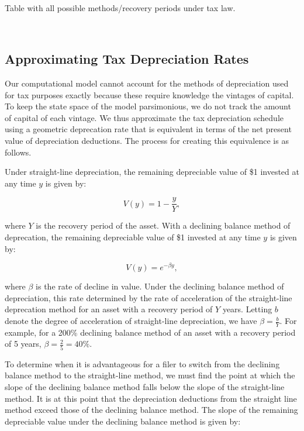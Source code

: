 \documentclass[article,11pt,letterpaper,fleqn]{article}
\theoremstyle{definition}
\numberwithin{equation}{section}
\begin{document}
\ \\
\begin{center}
Table with all possible methods/recovery periods under tax law.
\end{center}
\ \\


\subsection{Approximating Tax Depreciation Rates}
\label{sec:approx_tax_depr_rates}

Our computational model cannot account for the methods of depreciation used for tax purposes exactly because these require knowledge the vintages of capital.  To keep the state space of the model parsimonious, we do not track the amount of capital of each vintage.  We thus approximate the tax depreciation schedule using a geometric deprecation rate that is equivalent in terms of the net present value of depreciation deductions.  The process for creating this equivalence is as follows.  

Under straight-line depreciation, the remaining depreciable value of \$1 invested at any time $y$ is given by: 

\begin{equation}
V(y) =  1-\frac{y}{Y}, 
\end{equation}

\noindent\noindent where $Y$ is the recovery period of the asset.  With a declining balance method of deprecation, the remaining depreciable value of \$1 invested at any time $y$ is given by:

\begin{equation}
V(y) =  e^{-\beta y}, 
\end{equation}

\noindent\noindent where $\beta$ is the rate of decline in value.  Under the declining balance method of depreciation, this rate determined by the rate of acceleration of the straight-line deprecation method for an asset with a recovery period of $Y$ years.  Letting $b$ denote the degree of acceleration of straight-line depreciation, we have $\beta=\frac{b}{Y}$.  For example, for a 200\% declining balance method of an asset with a recovery period of 5 years, $\beta =\frac{2}{5}=40\%$.

To determine when it is advantageous for a filer to switch from the declining balance method to the straight-line method, we must find the point at which the slope of the declining balance method falls below the slope of the straight-line method.  It is at this point that the depreciation deductions from the straight line method exceed those of the declining balance method.  The slope of the remaining depreciable value under the declining balance method is given by:
\end{document}

